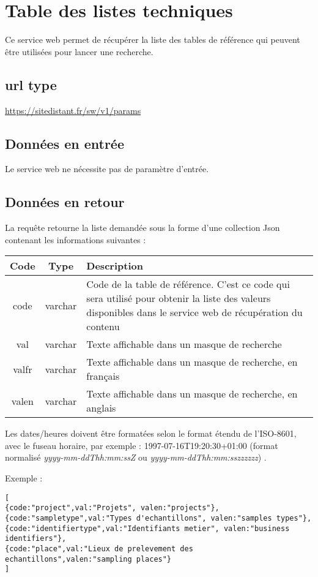 \section{Table des listes techniques}

Ce service web permet de récupérer la liste des tables de référence qui peuvent être utilisées pour lancer une recherche.

\subsection{url type}
\url{https://sitedistant.fr/sw/v1/params}

\subsection{Données en entrée}
Le service web ne nécessite pas de paramètre d'entrée.


\subsection{Données en retour}
La requête retourne la liste demandée sous la forme d'une collection Json contenant les informations suivantes :

\begin{longtable}{|c|c|>{\raggedright\arraybackslash}p{6cm}|}
\hline 
Code & Type & Description \\ 
\hline
code & varchar & Code de la table de référence. C'est ce code qui sera utilisé pour obtenir la liste des valeurs disponibles dans le service web de récupération du contenu\\
\hline
val & varchar & Texte affichable dans un masque de recherche\\
\hline
valfr & varchar & Texte affichable dans un masque de recherche, en français\\
\hline
valen & varchar & Texte affichable dans un masque de recherche, en anglais\\
\hline \endhead
\end{longtable}

Les dates/heures doivent être formatées selon le format étendu de l'ISO-8601, avec le fuseau horaire, par exemple :  1997-07-16T19:20:30+01:00 (format normalisé \textit{yyyy-mm-ddThh:mm:ssZ} ou \textit{yyyy-mm-ddThh:mm:sszzzzzz}) .

Exemple :
\begin{lstlisting}
[
{code:"project",val:"Projets", valen:"projects"},
{code:"sampletype",val:"Types d'echantillons", valen:"samples types"},
{code:"identifiertype",val:"Identifiants metier", valen:"business identifiers"},
{code:"place",val:"Lieux de prelevement des echantillons",valen:"sampling places"}
]
\end{lstlisting}

